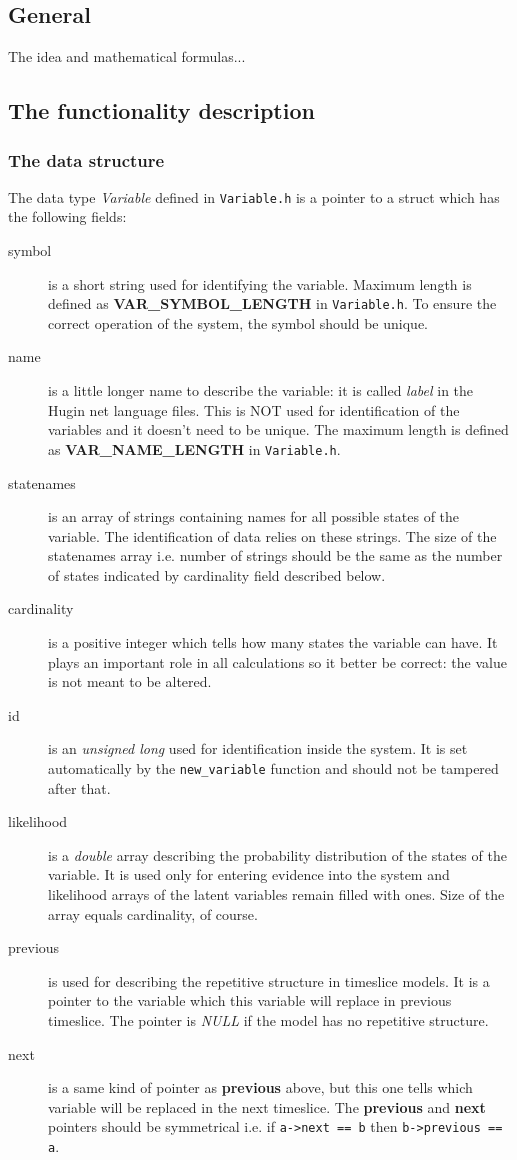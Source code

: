 \documentclass[12pt,a4paper]{report}
\begin{document}
\subsection{General}

The idea and mathematical formulas...

\subsection{The functionality description}

\subsubsection{The data structure}
The data type {\it Variable} defined in \verb+Variable.h+ is a pointer 
to a struct which has the following fields: 
\begin{description}
\item[symbol] is a short string used for identifying the variable. Maximum
length is defined as \textbf{VAR\_SYMBOL\_LENGTH} in
\verb+Variable.h+. To ensure the correct operation of the system, the 
symbol should be unique.
\item[name] is a little longer name to describe the variable: it is
called {\it label} in the Hugin net language files. This is NOT used for 
identification of the variables and it doesn't need to be unique. 
The maximum length is defined as \textbf{VAR\_NAME\_LENGTH} in 
\verb+Variable.h+.
\item[statenames] is an array of strings containing names for all
possible states of the variable. The identification of data relies on
these strings. The size of the statenames array i.e. number of
strings should be the same as the number of states indicated by
cardinality field described below.
\item[cardinality] is a positive integer which tells how many states
the variable can have. It plays an important role in all calculations
so it better be correct: the value is not meant to be altered.
\item[id] is an {\it unsigned long} used for identification inside the
system. It is set automatically by the \verb+new_variable+ function
and should not be tampered after that.
\item[likelihood] is a {\it double} array describing the probability
distribution of the states of the variable. It is used only for
entering evidence into the system and likelihood arrays of the latent
variables remain filled with ones. Size of the array equals
cardinality, of course.
\item[previous] is used for describing the repetitive structure in
timeslice models. It is a pointer to the variable which this variable
will replace in previous timeslice. The pointer is {\it NULL} if the
model has no repetitive structure.
\item[next] is a same kind of pointer as \textbf{previous} above, but
this one tells which variable will be replaced in the next timeslice.
The \textbf{previous} and \textbf{next} pointers should be symmetrical
i.e. if \verb+a->next == b+ then \verb+b->previous == a+.
\end{description}
\end{document}

